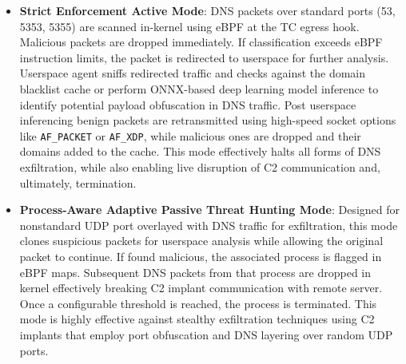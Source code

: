 \documentclass [11pt, proquest] {uwthesis}[2020/02/24]
\begin{document}
\begin{itemize}[itemsep=1pt,parsep=0pt]
    \item \textbf{Strict Enforcement Active Mode}: DNS packets over standard ports (53, 5353, 5355) are scanned in-kernel using eBPF at the TC egress hook. Malicious packets are dropped immediately. If classification exceeds eBPF instruction limits, the packet is redirected to userspace for further analysis. Userspace agent sniffs redirected traffic and checks against the domain blacklist cache or perform ONNX-based deep learning model inference to identify potential payload obfuscation in DNS traffic. Post userspace inferencing benign packets are retransmitted using high-speed socket options like \texttt{AF\_PACKET} or \texttt{AF\_XDP}, while malicious ones are dropped and their domains added to the cache. This mode effectively halts all forms of DNS exfiltration, while also enabling live disruption of C2 communication and, ultimately, termination.
    
    \item \textbf{Process-Aware Adaptive Passive Threat Hunting Mode}: Designed for nonstandard UDP port overlayed with DNS traffic for exfiltration, this mode clones suspicious packets for userspace analysis while allowing the original packet to continue. If found malicious, the associated process is flagged in eBPF maps. Subsequent DNS packets from that process are dropped in kernel effectively breaking C2 implant communication with remote server. Once a configurable threshold is reached, the process is terminated. This mode is highly effective against stealthy exfiltration techniques using C2 implants that employ port obfuscation and DNS layering over random UDP ports. 
\end{itemize}
\end{document}
